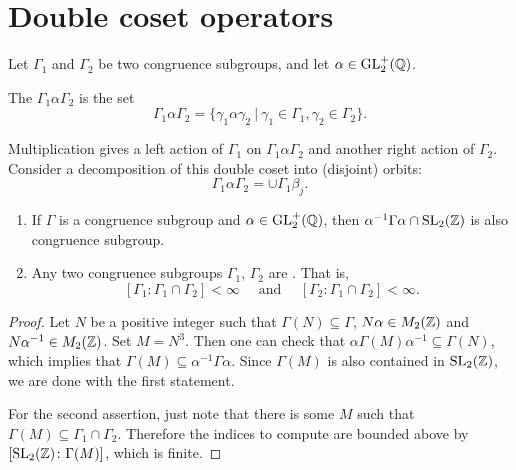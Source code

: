 \section{Double coset operators}
Let $\Gamma_1$ and $\Gamma_2$ be two congruence subgroups, and let $\alpha\in\operatorname{GL}_2^+(\mathbb{Q})$.
\begin{definition}
  The  $\Gamma_1\alpha\Gamma_2$ is the set
\[
\Gamma_1\alpha\Gamma_2=\{\gamma_1\alpha\gamma_2 ~|~ \gamma_1\in\Gamma_1,\gamma_2\in\Gamma_2\}.
\]
\end{definition}
Multiplication gives a left action of $\Gamma_1$ on $\Gamma_1\alpha\Gamma_2$ and another right action of $\Gamma_2$. Consider a decomposition of this double coset into (disjoint) orbits:
\[
\Gamma_1\alpha\Gamma_2=\cup \Gamma_1 \beta_j.
\]
\begin{lemma}
  \begin{enumerate}
  \item If $\Gamma$ is a congruence subgroup and $\alpha\in\operatorname{GL}_2^+(\mathbb{Q})$, then $\alpha^{-1}\Gamma\alpha\cap \operatorname{SL}_2(\mathbb{Z})$ is also congruence subgroup.
  \item Any two congruence subgroups $\Gamma_1$, $\Gamma_2$ are . That is,
\[
[\Gamma_1\colon \Gamma_1\cap\Gamma_2]<\infty\quad\text{ and }\quad [\Gamma_2\colon \Gamma_1\cap\Gamma_2]<\infty.
\]
  \end{enumerate}
\end{lemma}
\begin{proof}
  Let $N$ be a positive integer such that $\Gamma(N)\subseteq \Gamma$, $N\alpha\in M_2(\mathbb{Z})$ and $N\alpha^{-1}\in M_2(\mathbb{Z})$. Set $M=N^3$. Then one can check that $\alpha\Gamma(M)\alpha^{-1} \subseteq \Gamma(N)$,
which implies that $\Gamma(M)\subseteq \alpha^{-1}\Gamma\alpha$. Since $\Gamma(M)$ is also contained in $\operatorname{SL}_2(\mathbb{Z})$, we are done with the first statement.

For the second assertion, just note that there is some $M$ such that $\Gamma(M)\subseteq \Gamma_1\cap\Gamma_2$. Therefore the indices to compute are bounded above by $[\operatorname{SL}_2(\mathbb{Z})\colon\Gamma(M)]$, which is finite.
\end{proof}

